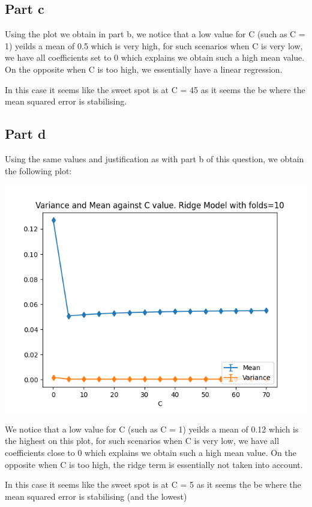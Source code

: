 \documentclass[10pt]{article}
\begin{document}
\subsection*{Part c}
Using the plot we obtain in part b, we notice that a low value for C (such as C = 1)
yeilds a mean of 0.5 which is very high, for such scenarios when C is very low, 
we have all coefficients set to 0 which explains we obtain such a high mean value.
On the opposite when C is too high, we essentially have a linear regression.

In this case it seems like the sweet spot is at C = 45 as it seems the be where the
mean squared error is stabilising.


\subsection*{Part d}
Using the same values and justification as with part b of this question,
we obtain the following plot:

\begin{center}
    \includegraphics[scale=0.4]{Figure_11.png}
\end{center}

We notice that a low value for C (such as C = 1)
yeilds a mean of 0.12 which is the highest on this plot, for such scenarios when C is very low, 
we have all coefficients close to 0 which explains we obtain such a high mean value.
On the opposite when C is too high, the ridge term is essentially not taken into account.

In this case it seems like the sweet spot is at C = 5 as it seems the be where the
mean squared error is stabilising (and the lowest)
\end{document}
